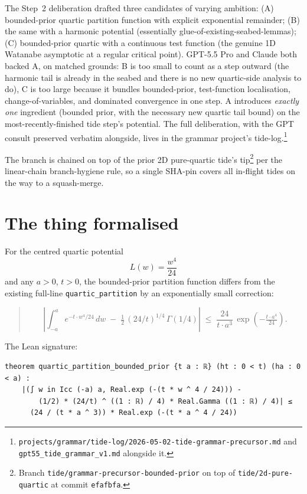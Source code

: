 \documentclass[11pt]{article}
\begin{document}
The Step~2 deliberation drafted three candidates of varying ambition:
(A) bounded-prior quartic partition function with explicit exponential
remainder; (B) the same with a harmonic potential (essentially
glue-of-existing-seabed-lemmas); (C) bounded-prior quartic with a
continuous test function (the genuine 1D Watanabe asymptotic at a
regular critical point). GPT-5.5 Pro and Claude both backed A, on
matched grounds: B is too small to count as a step outward (the harmonic
tail is already in the seabed and there is no new quartic-side analysis
to do), C is too large because it bundles bounded-prior, test-function
localisation, change-of-variables, and dominated convergence in one
step. A introduces \emph{exactly one} ingredient (bounded prior, with
the necessary new quartic tail bound) on the most-recently-finished
tide step's potential. The full deliberation, with the GPT consult
preserved verbatim alongside, lives in the grammar project's
tide-log.\footnote{\texttt{projects/grammar/tide-log/2026-05-02-tide-grammar-precursor.md}
and \texttt{gpt55\_tide\_grammar\_v1.md} alongside it.}

The branch is chained on top of the prior 2D pure-quartic tide's
tip\footnote{Branch \texttt{tide/grammar-precursor-bounded-prior} on top
of \texttt{tide/2d-pure-quartic} at commit \texttt{efafbfa}.} per the
linear-chain branch-hygiene rule, so a single SHA-pin covers all
in-flight tides on the way to a squash-merge.

\section{The thing formalised}

For the centred quartic potential
\[
  L(w) = \frac{w^4}{24}
\]
and any $a > 0$, $t > 0$, the bounded-prior partition function differs
from the existing full-line \texttt{quartic\_partition} by an
exponentially small correction:

\begin{quote}\itshape
\[
  \left| \int_{-a}^{a} e^{-t \cdot w^4/24}\, dw \;-\;
        \tfrac{1}{2}\,(24/t)^{1/4}\,\Gamma(1/4) \right|
  \;\le\; \frac{24}{t \cdot a^3}\,
          \exp\!\left(-\tfrac{t \cdot a^4}{24}\right).
\]
\end{quote}

\noindent The Lean signature:
\begin{verbatim}
theorem quartic_partition_bounded_prior {t a : ℝ} (ht : 0 < t) (ha : 0 < a) :
    |(∫ w in Icc (-a) a, Real.exp (-(t * w ^ 4 / 24))) -
        (1/2) * (24/t) ^ ((1 : ℝ) / 4) * Real.Gamma ((1 : ℝ) / 4)| ≤
      (24 / (t * a ^ 3)) * Real.exp (-(t * a ^ 4 / 24))
\end{verbatim}
\end{document}
